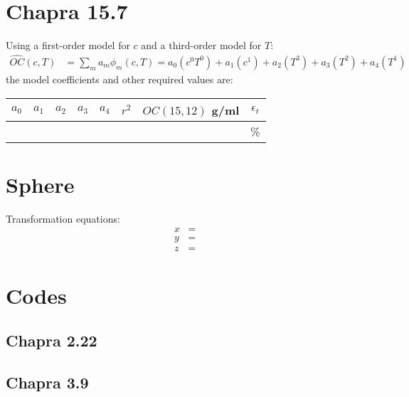 \documentclass{article}
\begin{document}
\section{Chapra 15.7}
Using a first-order model for $c$ and a third-order model for $T$:
\begin{align*}
\hat{OC}(c, T)&=
\sum_ma_m\phi_m(c, T)=a_0(c^0T^0)+a_1(c^1)+a_2(T^3)+a_3(T^2)+a_4(T^1) 
\end{align*}
the model coefficients and other required values are:
\begin{center}
\begin{tabular}{c|c|c|c|c|c|c|c}
$a_0$ & $a_1$ & $a_2$ & $a_3$ & $a_4$ & $r^2$ & $OC(15, 12)$ g/ml & $\epsilon_t$ \\ \hline
 &  &  &  &  &  &  & \%
\end{tabular}
\end{center}

\section{Sphere}
Transformation equations:
\begin{align*}
x&=\\
y&=\\
z&=
\end{align*}
\pagebreak

\appendix
\section{Codes}



\lstset{style=python103, language=python} 

\subsection{Chapra 2.22}
\pagebreak

\subsection{Chapra 3.9}
\pagebreak
\end{document}
